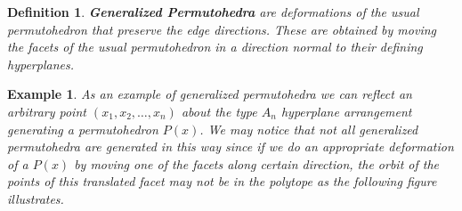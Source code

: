 \documentclass[12pt]{amsart}
\newtheorem{definition}{Definition}
\newtheorem{example}[lemma]{Example}
\numberwithin{equation}{section}
\begin{document}
\begin{definition}
 {\bf Generalized Permutohedra} are deformations of the usual 
permutohedron that preserve the edge directions.  These are obtained by
moving the facets of the usual permutohedron in a direction normal 
to their defining hyperplanes. 
\end{definition}
\begin{example}
As an example of {\em generalized permutohedra} we can reflect an arbitrary point $(x_1, x_2, \dots , x_n)$ about the type $A_n$ hyperplane arrangement generating a permutohedron $P(x)$. We may notice that not all generalized permutohedra are generated in this way since if we do an appropriate deformation of a $P(x)$ by moving one of the facets along certain direction, the orbit of the points of this translated facet may not be in the polytope as the following figure illustrates.   
\begin{center}


\end{center}
\end{example}
\end{document}
